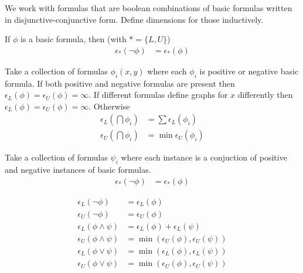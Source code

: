 \documentclass{amsart}
\begin{document}
We work with formulas that are boolean combinations of basic formulas written in disjunctive-conjunctive form.
Define dimensions for those inductively.

\begin{Definition}[Negation]
	If $\phi$ is a basic formula, then (with $* = \{L, U\}$)
	\begin{align*}
		\epsilon_*(\neg \phi) &= \epsilon_*(\phi)
	\end{align*}
\end{Definition}

\begin{Definition}[Conjunction]
	Take a collection of formulas $\phi_i(x, y)$ where each $\phi_i$ is positive or negative basic formula.
	If both positive and negative formulas are present then $\epsilon_L(\phi) = \epsilon_U(\phi) = \infty$.
	If different formulas define graphs for $x$ differently then $\epsilon_L(\phi) = \epsilon_U(\phi) = \infty$.
	Otherwise
	\begin{align*}
		\epsilon_L(\bigcap \phi_i) &= \sum \epsilon_L(\phi_i) \\
		\epsilon_U(\bigcap \phi_i) &= \min \epsilon_U(\phi_i)
	\end{align*}
\end{Definition}

\begin{Definition} [Disjunction]
	Take a collection of formulas $\psi_i$ where each instance is a conjuction of positive and negative instances of basic formulas.
	\begin{align*}
		\epsilon_*(\neg \phi) &= \epsilon_*(\phi)
	\end{align*}
\end{Definition}

\begin{Definition}
\begin{align*}
	\epsilon_L(\neg \phi) &= \epsilon_L(\phi) \\
	\epsilon_U(\neg \phi) &= \epsilon_U(\phi) \\
	\epsilon_L(\phi \wedge \psi) &= \epsilon_L(\phi) + \epsilon_L(\psi) \\
	\epsilon_U(\phi \wedge \psi) &= \min(\epsilon_U(\phi), \epsilon_U(\psi)) \\
	\epsilon_L(\phi \vee \psi) &= \min(\epsilon_L(\phi), \epsilon_L(\psi)) \\
	\epsilon_U(\phi \vee \psi) &= \min(\epsilon_U(\phi), \epsilon_U(\psi)) 
\end{align*}
\end{Definition}
\end{document}
